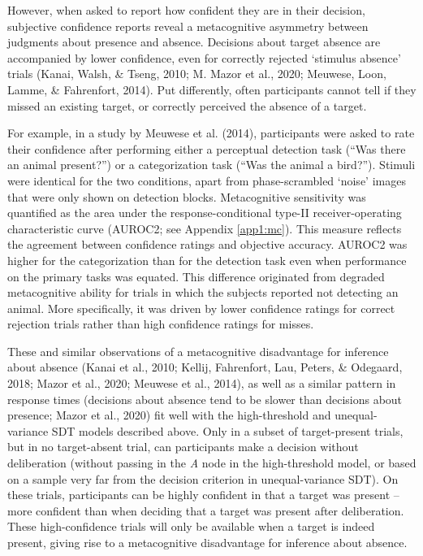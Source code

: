 \documentclass[12pt,twoside]{reedthesis}
\begin{document}
However, when asked to report how confident they are in their decision, subjective confidence reports reveal a metacognitive asymmetry between judgments about presence and absence. Decisions about target absence are accompanied by lower confidence, even for correctly rejected `stimulus absence' trials (Kanai, Walsh, \& Tseng, 2010; M. Mazor et al., 2020; Meuwese, Loon, Lamme, \& Fahrenfort, 2014). Put differently, often participants cannot tell if they missed an existing target, or correctly perceived the absence of a target.

For example, in a study by Meuwese et al. (2014), participants were asked to rate their confidence after performing either a perceptual detection task (``Was there an animal present?'') or a categorization task (``Was the animal a bird?''). Stimuli were identical for the two conditions, apart from phase-scrambled `noise' images that were only shown on detection blocks. Metacognitive sensitivity was quantified as the area under the response-conditional type-II receiver-operating characteristic curve (AUROC2; see Appendix \ref{app1:mc}). This measure reflects the agreement between confidence ratings and objective accuracy. AUROC2 was higher for the categorization than for the detection task even when performance on the primary tasks was equated. This difference originated from degraded metacognitive ability for trials in which the subjects reported not detecting an animal. More specifically, it was driven by lower confidence ratings for correct rejection trials rather than high confidence ratings for misses.

These and similar observations of a metacognitive disadvantage for inference about absence (Kanai et al., 2010; Kellij, Fahrenfort, Lau, Peters, \& Odegaard, 2018; Mazor et al., 2020; Meuwese et al., 2014), as well as a similar pattern in response times (decisions about absence tend to be slower than decisions about presence; Mazor et al., 2020) fit well with the high-threshold and unequal-variance SDT models described above. Only in a subset of target-present trials, but in no target-absent trial, can participants make a decision without deliberation (without passing in the \emph{A} node in the high-threshold model, or based on a sample very far from the decision criterion in unequal-variance SDT). On these trials, participants can be highly confident in that a target was present -- more confident than when deciding that a target was present after deliberation. These high-confidence trials will only be available when a target is indeed present, giving rise to a metacognitive disadvantage for inference about absence.
\end{document}
